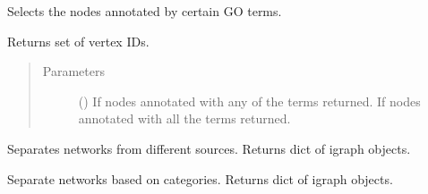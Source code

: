 \documentclass[letterpaper,10pt,english]{sphinxmanual}
\begin{document}
\begin{fulllineitems}

\begin{fulllineitems}
\label{\detokenize{main:pypath.main.PyPath.select_by_go}}
Selects the nodes annotated by certain GO terms.

Returns set of vertex IDs.
\begin{quote}\begin{description}
\item[{Parameters}] \leavevmode
{} () \textendash{} If  nodes annotated with any of the terms returned.
If  nodes annotated with all the terms returned.

\end{description}\end{quote}

\end{fulllineitems}


\begin{fulllineitems}
\label{\detokenize{main:pypath.main.PyPath.separate}}
Separates networks from different sources.
Returns dict of igraph objects.

\end{fulllineitems}


\begin{fulllineitems}
\label{\detokenize{main:pypath.main.PyPath.separate_by_category}}
Separate networks based on categories.
Returns dict of igraph objects.

\end{fulllineitems}


\begin{fulllineitems}
\label{\detokenize{main:pypath.main.PyPath.sequences}}
\end{fulllineitems}


\end{fulllineitems}
\end{document}

